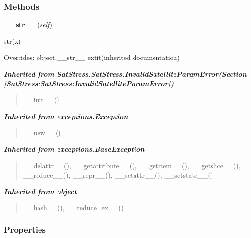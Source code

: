   \subsubsection{Methods}

    \vspace{0.5ex}

\hspace{.8\funcindent}\begin{boxedminipage}{\funcwidth}

    \raggedright \textbf{\_\_str\_\_}(\textit{self})

\setlength{\parskip}{2ex}
    str(x)

\setlength{\parskip}{1ex}
      Overrides: object.\_\_str\_\_ 	extit{(inherited documentation)}

    \end{boxedminipage}


\large{\textbf{\textit{Inherited from SatStress.SatStress.InvalidSatelliteParamError\textit{(Section \ref{SatStress:SatStress:InvalidSatelliteParamError})}}}}

\begin{quote}
\_\_init\_\_()
\end{quote}

\large{\textbf{\textit{Inherited from exceptions.Exception}}}

\begin{quote}
\_\_new\_\_()
\end{quote}

\large{\textbf{\textit{Inherited from exceptions.BaseException}}}

\begin{quote}
\_\_delattr\_\_(), \_\_getattribute\_\_(), \_\_getitem\_\_(), \_\_getslice\_\_(), \_\_reduce\_\_(), \_\_repr\_\_(), \_\_setattr\_\_(), \_\_setstate\_\_()
\end{quote}

\large{\textbf{\textit{Inherited from object}}}

\begin{quote}
\_\_hash\_\_(), \_\_reduce\_ex\_\_()
\end{quote}


  \subsubsection{Properties}

